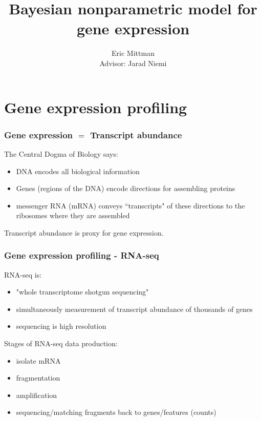 \documentclass{beamer}
\title{Bayesian nonparametric model for gene expression}
\author{Eric Mittman \\ \vspace{.5cm} Advisor: Jarad Niemi}
\begin{document}
\frame{\titlepage}


\section[Gene Expr.]{Gene expression profiling}

\begin{frame}[label=current]
\frametitle{Gene expression $=$ Transcript abundance}
{\scriptsize \citep[\textit{Statistical Analysis of Next Generation Sequencing Data}]{datta2014}}
The Central Dogma of Biology says:
\begin{itemize}
\pause\item DNA encodes all biological information
\pause\item Genes (regions of the DNA) encode directions for assembling proteins
\pause\item messenger RNA (mRNA) conveys ``transcripts" of these directions to the ribosomes where they are assembled 
\end{itemize}
\pause Transcript abundance is proxy for gene expression.
\end{frame}

\begin{frame}[label=current]
\frametitle{Gene expression profiling - RNA-seq}
\pause RNA-seq is:
\vspace{.5cm}
\begin{itemize}
\pause \item "whole transcriptome shotgun sequencing"
\pause \item simultaneously measurement of transcript abundance of thousands of genes
\pause \item sequencing is high resolution
\end{itemize}

\vspace{.5cm}
Stages of RNA-seq data production:
\vspace{.5cm}
\begin{itemize}
\pause \item isolate mRNA
\pause \item fragmentation
\pause \item amplification
\pause \item sequencing/matching fragments back to genes/features (counts)
\end{itemize}
\end{frame}
\end{document}
